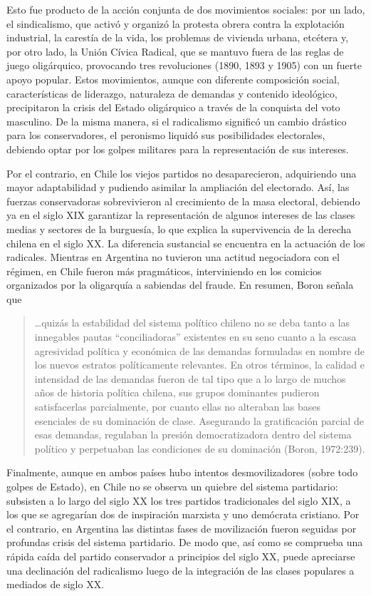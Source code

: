 Esto fue producto de la acción conjunta de dos movimientos sociales: por un lado, el sindicalismo, que activó y organizó la protesta obrera contra la explotación industrial, la carestía de la vida, los problemas de vivienda urbana, etcétera y, por otro lado, la Unión Cívica Radical, que se mantuvo fuera de las reglas de juego oligárquico, provocando tres revoluciones (1890, 1893 y 1905) con un fuerte apoyo popular. Estos movimientos, aunque con diferente composición social, características de liderazgo, naturaleza de demandas y contenido ideológico, precipitaron la crisis del Estado oligárquico a través de la conquista del voto masculino. De la misma manera, si el radicalismo significó un cambio drástico para los conservadores, el peronismo liquidó sus posibilidades electorales, debiendo optar por los golpes militares para la representación de sus intereses.

Por el contrario, en Chile los viejos partidos no desaparecieron, adquiriendo una mayor adaptabilidad y pudiendo asimilar la ampliación del electorado. Así, las fuerzas conservadoras sobrevivieron al crecimiento de la masa electoral, debiendo ya en el siglo XIX garantizar la representación de algunos intereses de las clases medias y sectores de la burguesía, lo que explica la supervivencia de la derecha chilena en el siglo XX. La diferencia sustancial se encuentra en la actuación de los radicales. Mientras en Argentina no tuvieron una actitud negociadora con el régimen, en Chile fueron más pragmáticos, interviniendo en los comicios organizados por la oligarquía a sabiendas del fraude. En resumen, Boron señala que

\begin{quote}
\ldots quizás la estabilidad del sistema político chileno no se deba tanto a las innegables pautas ``conciliadoras'' existentes en su seno cuanto a la escasa agresividad política y económica de las demandas formuladas en nombre de los nuevos estratos políticamente relevantes. En otros términos, la calidad e intensidad de las demandas fueron de tal tipo que a lo largo de muchos años de historia política chilena, sus grupos dominantes pudieron satisfacerlas parcialmente, por cuanto ellas no alteraban las bases esenciales de su dominación de clase. Asegurando la gratificación parcial de esas demandas, regulaban la presión democratizadora dentro del sistema político y perpetuaban las condiciones de su dominación (Boron, 1972:239).
\end{quote}

Finalmente, aunque en ambos países hubo intentos desmovilizadores (sobre todo golpes de Estado), en Chile no se observa un quiebre del sistema partidario: subsisten a lo largo del siglo XX los tres partidos tradicionales del siglo XIX, a los que se agregarían dos de inspiración marxista y uno demócrata cristiano. Por el contrario, en Argentina las distintas fases de movilización fueron seguidas por profundas crisis del sistema partidario. De modo que, así como se comprueba una rápida caída del partido conservador a principios del siglo XX, puede apreciarse una declinación del radicalismo luego de la integración de las clases populares a mediados de siglo XX.

